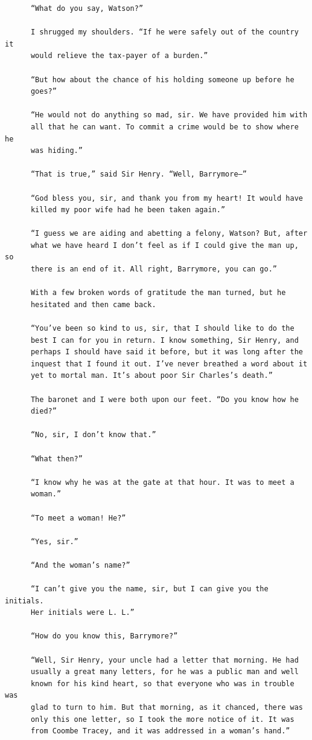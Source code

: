 \documentclass{article}
\begin{document}
\begin{verbatim}
      “What do you say, Watson?”

      I shrugged my shoulders. “If he were safely out of the country it
      would relieve the tax-payer of a burden.”

      “But how about the chance of his holding someone up before he
      goes?”

      “He would not do anything so mad, sir. We have provided him with
      all that he can want. To commit a crime would be to show where he
      was hiding.”

      “That is true,” said Sir Henry. “Well, Barrymore—”

      “God bless you, sir, and thank you from my heart! It would have
      killed my poor wife had he been taken again.”

      “I guess we are aiding and abetting a felony, Watson? But, after
      what we have heard I don’t feel as if I could give the man up, so
      there is an end of it. All right, Barrymore, you can go.”

      With a few broken words of gratitude the man turned, but he
      hesitated and then came back.

      “You’ve been so kind to us, sir, that I should like to do the
      best I can for you in return. I know something, Sir Henry, and
      perhaps I should have said it before, but it was long after the
      inquest that I found it out. I’ve never breathed a word about it
      yet to mortal man. It’s about poor Sir Charles’s death.”

      The baronet and I were both upon our feet. “Do you know how he
      died?”

      “No, sir, I don’t know that.”

      “What then?”

      “I know why he was at the gate at that hour. It was to meet a
      woman.”

      “To meet a woman! He?”

      “Yes, sir.”

      “And the woman’s name?”

      “I can’t give you the name, sir, but I can give you the initials.
      Her initials were L. L.”

      “How do you know this, Barrymore?”

      “Well, Sir Henry, your uncle had a letter that morning. He had
      usually a great many letters, for he was a public man and well
      known for his kind heart, so that everyone who was in trouble was
      glad to turn to him. But that morning, as it chanced, there was
      only this one letter, so I took the more notice of it. It was
      from Coombe Tracey, and it was addressed in a woman’s hand.”


\end{verbatim}
\end{document}
